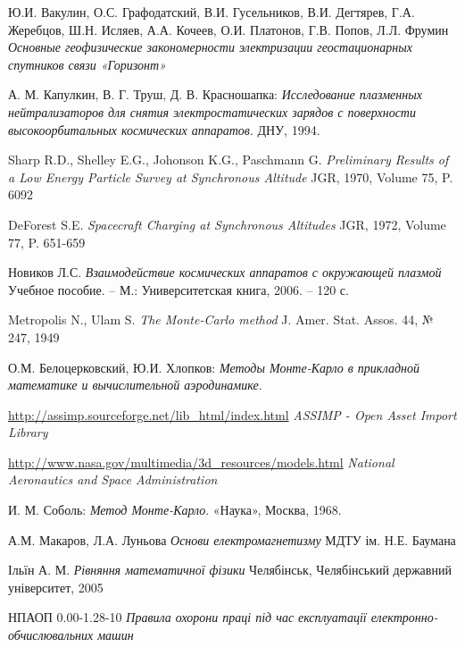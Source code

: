 \documentclass[a4paper,12pt]{article}
\begin{document}
\begin{thebibliography}{9}

  Ю.И. Вакулин, О.С. Графодатский, В.И. Гусельников, В.И. Дегтярев, Г.А. Жеребцов, Ш.Н. Исляев, А.А. Кочеев, О.И. Платонов, Г.В. Попов, Л.Л. Фрумин
  \emph{Основные геофизические закономерности электризации геостационарных спутников связи «Горизонт»}

  А. М. Капулкин, В. Г. Труш, Д. В. Красношапка:
  \emph{Исследование плазменных нейтрализаторов для снятия электростатических зарядов с поверхности высокоорбитальных космических аппаратов}.
  ДНУ, 1994.

  Sharp R.D., Shelley E.G., Johonson K.G., Paschmann G.
  \emph{Preliminary Results of a Low Energy Particle Survey at Synchronous Altitude}
  JGR, 1970, Volume 75, P. 6092

  DeForest S.E.
  \emph{Spacecraft Charging at Synchronous Altitudes}
  JGR, 1972, Volume 77, P. 651-659

  Новиков Л.С.
  \emph{Взаимодействие космических аппаратов с окружающей плазмой}
  Учебное пособие. -- М.: Университетская книга, 2006. -- 120 с.
  
  Metropolis N., Ulam S.
  \emph{The Monte-Carlo method}
  J. Amer. Stat. Assos. 44,  № 247, 1949

  О.М. Белоцерковский, Ю.И. Хлопков:
  \emph{Методы Монте-Карло в прикладной математике и вычислительной аэродинамике}.

  \url{http://assimp.sourceforge.net/lib_html/index.html}
  \emph{ASSIMP - Open Asset Import Library}
  
  \url{http://www.nasa.gov/multimedia/3d_resources/models.html}
  \emph{National Aeronautics and Space Administration}
  
  И. М. Соболь:
  \emph{Метод Монте-Карло}.
  «Наука», Москва, 1968.
  
    А.М. Макаров, Л.А. Луньова
    \emph{Основи електромагнетизму}
    МДТУ ім. Н.Е. Баумана  
      
	Ільїн А. М.
	\emph{Рівняння математичної фізики}
	Челябінськ, Челябінський державний університет, 2005
	
	НПАОП 0.00-1.28-10
	\emph{Правила охорони праці під час експлуатації електронно-обчислювальних машин}
	

\end{thebibliography}
\end{document}
